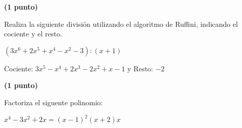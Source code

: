 \documentclass[palatino,noprobframes]{CuartillaSafa}
\begin{document}
\begin{problem}\textbf{(1 punto)}

	Realiza la siguiente división utilizando el algoritmo de Ruffini, indicando el cociente y el resto.

	$(3x^6+2x^5+x^4-x^2-3) : (x+1)$

	Cociente: $3x^5-x^4+2x^3-2x^2+x-1$ y Resto: $-2$

\end{problem}

\begin{problem}\textbf{(1 punto)}

	Factoriza el siguente polinomio:

	$x^4-3x^2+2x = (x-1)^2(x+2)x$


\end{problem}

\end{document}
